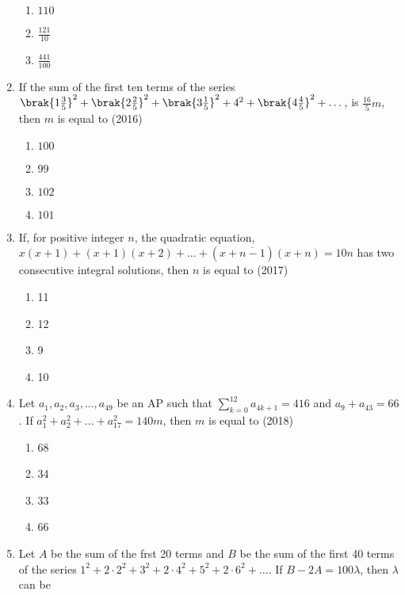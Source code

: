 \begin{enumerate}[label=\thesubsection.\arabic*,ref=\thesubsection.\theenumi]
\begin{multicols}{4}
\begin{enumerate}
    \item$110$
    \item$\frac{121}{10}$
    \item$\frac{441}{100}$ 
    \end{enumerate}
\end{multicols}
%
    \item If the sum of the first ten terms of the series $\brak{1\frac{3}{5}}^2+\brak{2\frac{2}{5}}^2+\brak{3\frac{1}{5}}^2+4^2+\brak{4\frac{4}{5}}^2+\dots$,  is $\frac{16}{5}m$,  then $m$ is equal to 
%    
    \hfill(2016)
    \begin{multicols}{4}
\begin{enumerate}    
    \item$100$
    \item$99$
    \item$102$
    \item$101$
    \end{enumerate}
\end{multicols}
%
% 
	\item If,  for positive integer $n$,  the quadratic equation,  $x(x+1)+(x+1)(x+2)+\dots+(x+\overline{n-1})(x+n)=10n$  has two consecutive integral solutions,  then $n$ is equal to     \hfill{(2017)}  
\begin{multicols}{4}
\begin{enumerate}    
    \item {11}
    \item{12}
    \item {9} 
    \item{10}\end{enumerate}
    \end{multicols}
%
  \item Let $a_{1}, a_{2}, a_{3}, \dots, a_{49}$ be an AP such that $\sum_{k=0}^{12} a_{4k+1}=416$ and $a_{9}+a_{43}=66$. If $a_{1}^2+ a_{2}^{2}+\dots+a_{17}^{2}=140m$,  then $m$ is equal to \hfill{(2018)}\begin{multicols}{4}
\begin{enumerate}    
  \item {68}\item {34}\item{33}  \item{66}
  \end{enumerate}
\end{multicols}
  \item Let $A$ be the sum of the frst 20 terms and $B$ be the sum of the first 40 terms of the series $1^{2} +2\cdot2^{2}+3^{2}+2\cdot4^{2}+5^{2}+2\cdot6^{2}+\dots$. If $B-2A=100\lambda$,  then $\lambda$ can be 
	 

\end{enumerate}
